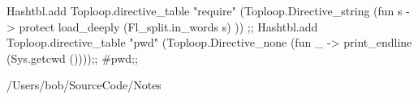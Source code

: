 \begin{enumerate}
\begin{itemize}
    

\begin{redcode}
Hashtbl.add
    Toploop.directive_table
    "require"
    (Toploop.Directive_string
       (fun s ->
	  protect load_deeply (Fl_split.in_words s)
       ))
;;
Hashtbl.add Toploop.directive_table "pwd"
(Toploop.Directive_none (fun _ -> 
  print_endline (Sys.getcwd ())));;
#pwd;;
\end{redcode}

\begin{bluecode}
/Users/bob/SourceCode/Notes
\end{bluecode}



  \end{itemize}
\end{enumerate}


